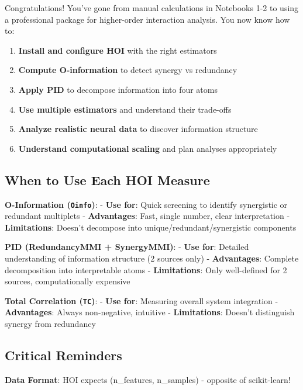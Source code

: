 \documentclass[
  11pt,
  letterpaper,
  oneside,
  openany]{book}
\providecommand{\tightlist}{%
  \setlength{\itemsep}{0pt}\setlength{\parskip}{0pt}}
\begin{document}
Congratulations! You've gone from manual calculations in Notebooks 1-2
to using a professional package for higher-order interaction analysis.
You now know how to:

\begin{enumerate}
\def\labelenumi{\arabic{enumi}.}
\tightlist
\item
  \textbf{Install and configure HOI} with the right estimators
\item
  \textbf{Compute O-information} to detect synergy vs redundancy
\item
  \textbf{Apply PID} to decompose information into four atoms
\item
  \textbf{Use multiple estimators} and understand their trade-offs
\item
  \textbf{Analyze realistic neural data} to discover information
  structure
\item
  \textbf{Understand computational scaling} and plan analyses
  appropriately
\end{enumerate}

\subsection{When to Use Each HOI
Measure}\label{when-to-use-each-hoi-measure}

\textbf{O-Information (\texttt{Oinfo})}: - \textbf{Use for}: Quick
screening to identify synergistic or redundant multiplets -
\textbf{Advantages}: Fast, single number, clear interpretation -
\textbf{Limitations}: Doesn't decompose into
unique/redundant/synergistic components

\textbf{PID (RedundancyMMI + SynergyMMI)}: - \textbf{Use for}: Detailed
understanding of information structure (2 sources only) -
\textbf{Advantages}: Complete decomposition into interpretable atoms -
\textbf{Limitations}: Only well-defined for 2 sources, computationally
expensive

\textbf{Total Correlation (\texttt{TC})}: - \textbf{Use for}: Measuring
overall system integration - \textbf{Advantages}: Always non-negative,
intuitive - \textbf{Limitations}: Doesn't distinguish synergy from
redundancy

\subsection{Critical Reminders}\label{critical-reminders}

\textbf{Data Format}: HOI expects (n\_features, n\_samples) - opposite
of scikit-learn!
\end{document}
